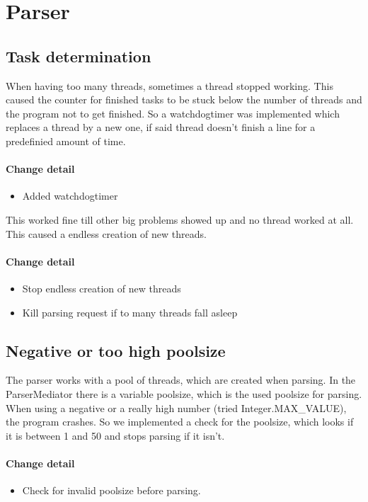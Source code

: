 \section{Parser}

\subsection{Task determination} 
When having too many threads, sometimes a thread stopped working. This caused the counter for finished tasks
to be stuck below the number of threads and the program not to get finished.
So a watchdogtimer was implemented which replaces a thread by a new one, if said thread doesn't finish a line for a 
predefinied amount of time.

\paragraph{Change detail}
\begin{itemize}
  \item Added watchdogtimer
\end{itemize}

This worked fine till other big problems showed up and no thread worked at all. This caused
a endless creation of new threads.

\paragraph{Change detail}
\begin{itemize}
  \item Stop endless creation of new threads
  \item Kill parsing request if to many threads fall asleep
\end{itemize}


\subsection{Negative or too high poolsize}
The parser works with a pool of threads, which are created when parsing. In the ParserMediator there is
a variable poolsize, which is the used poolsize for parsing.
When using a negative or a really high number (tried Integer.MAX\_VALUE), the program crashes. 
So we implemented a check for the poolsize, which looks if it is between 1 and 50 and stops parsing if it isn't.

\paragraph{Change detail}
\begin{itemize}
  \item Check for invalid poolsize before parsing.
\end{itemize}

